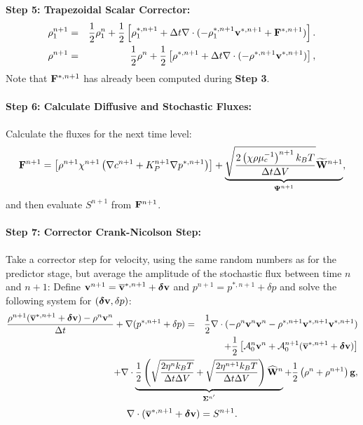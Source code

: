 \documentclass[final]{siamltex}
\def\Fb {{\bf F}}
\def\gb {{\bf g}}
\def\vb {{\bf v}}
\def\Wb {{\bf W}}
\def\deltab {\boldsymbol{\delta}}
\def\Psib   {\boldsymbol{\Psi}}
\def\Sigmab {\boldsymbol{\Sigma}}
\def\half   {\frac{1}{2}}
\begin{document}
{\bf Step 5: Trapezoidal Scalar Corrector:}
\begin{eqnarray}
\rho_1^{n+1} &=& \half\rho_1^n + \half\left[\rho_1^{*,n+1} + \Delta t\nabla\cdot(-\rho_1^{*,n+1}\vb^{*,n+1} + \Fb^{*,n+1})\right].\label{eq:alg1_2nd_rho1_adv}\\
\rho^{n+1} &=& \half\rho^n + \half\left[\rho^{*,n+1} + \Delta t\nabla\cdot(-\rho^{*,n+1}\vb^{*,n+1})\right],\label{eq:alg1_2nd_rho_adv}
\end{eqnarray}
Note that $\Fb^{*,n+1}$ has already been computed during {\bf Step 3}.\\ \\
{\bf Step 6: Calculate Diffusive and Stochastic Fluxes:}\\ \\
Calculate the fluxes for the next time level:
\begin{equation}
\Fb^{n+1} = \left[\rho^{n+1}\chi^{n+1}\left(\nabla c^{n+1} + K_P^{n+1}\nabla p^{*,n+1}\right)\right] + \underbrace{\sqrt{\frac{2\left(\chi\rho\mu_c^{-1}\right)^{n+1}k_B T}{\Delta t\Delta V}}\widetilde\Wb^{n+1}}_{\Psib^{n+1}},
\end{equation}
and then evaluate $S^{n+1}$ from $\Fb^{n+1}$.\\ \\
{\bf Step 7: Corrector Crank-Nicolson Step:}\\ \\
Take a corrector step for velocity, using the same random numbers as for the predictor
stage, but average the amplitude of the stochastic flux between time $n$ and $n+1$:
Define $\vb^{n+1} = \overline\vb^{*,n+1} + \deltab\vb$ and $p^{n+1} = p^{*,n+1} + \delta p$ and
solve the following system for $(\deltab\vb,\delta p)$:
\begin{eqnarray}
\frac{\rho^{n+1}(\overline\vb^{*,n+1} + \deltab\vb) - \rho^n\vb^n}{\Delta t} + \nabla(p^{*,n+1}+\delta p) &=& \half\nabla\cdot(-\rho^n\vb^n\vb^n - \rho^{*,n+1}\vb^{*,n+1}\vb^{*,n+1})\nonumber\\
&&\hspace{-1.5in}+ \half\left[\mathcal{A}_0^n\vb^n + \mathcal{A}_0^{n+1}(\overline\vb^{*,n+1} + \deltab\vb)\right]\nonumber\\
&&\hspace{-1.5in}+ \nabla\cdot\underbrace{\half\left(\sqrt{\frac{2\eta^n k_B T}{\Delta t\Delta V}} + \sqrt{\frac{2\eta^{n+1} k_B T}{\Delta t\Delta V}}\right)\widehat\Wb^n}_{\Sigmab^{n'}} + \half\left(\rho^n+\rho^{n+1}\right)\gb,
\end{eqnarray}
\begin{equation}
\nabla\cdot(\overline\vb^{*,n+1} + \deltab\vb) = S^{n+1}.
\end{equation}
\end{document}

